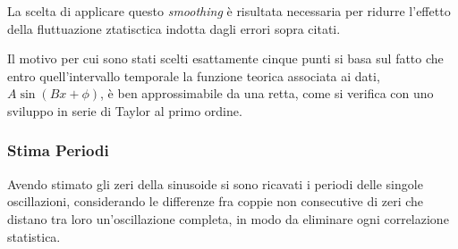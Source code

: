 \documentclass[a4paper,11pt,oneside]{article}
\begin{document}

La scelta di applicare questo \textit{smoothing} è risultata necessaria per ridurre l'effetto della fluttuazione ztatisctica indotta dagli errori sopra citati. 

Il motivo per cui sono stati scelti esattamente cinque punti si basa sul fatto che entro quell'intervallo temporale la funzione teorica associata ai dati, $A \sin (Bx+\phi)$, è ben approssimabile da una retta, come si verifica con uno sviluppo in serie di Taylor al primo ordine.










\subsubsection{Stima Periodi}
Avendo stimato gli zeri della sinusoide si sono ricavati i periodi delle singole oscillazioni, considerando le differenze fra coppie non consecutive di zeri che distano tra loro un'oscillazione completa, in modo da eliminare ogni correlazione statistica.
\end{document}
